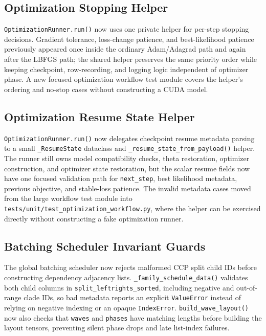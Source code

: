 \documentclass[11pt]{article}
\begin{document}
\subsection{Optimization Stopping Helper}

\texttt{OptimizationRunner.run()} now uses one private helper for per-step
stopping decisions.  Gradient tolerance, loss-change patience, and
best-likelihood patience previously appeared once inside the ordinary
Adam/Adagrad path and again after the LBFGS path; the shared helper preserves
the same priority order while keeping checkpoint, row-recording, and logging
logic independent of optimizer phase.  A new focused optimization workflow test
module covers the helper's ordering and no-stop cases without constructing a
CUDA model.

\subsection{Optimization Resume State Helper}

\texttt{OptimizationRunner.run()} now delegates checkpoint resume metadata
parsing to a small \texttt{\_ResumeState} dataclass and
\texttt{\_resume\_state\_from\_payload()} helper.  The runner still owns model
compatibility checks, theta restoration, optimizer construction, and optimizer
state restoration, but the scalar resume fields now have one focused validation
path for \texttt{next\_step}, best likelihood metadata, previous objective, and
stable-loss patience.  The invalid metadata cases moved from the large workflow
test module into \texttt{tests/unit/test\_optimization\_workflow.py}, where the
helper can be exercised directly without constructing a fake optimization
runner.

\subsection{Batching Scheduler Invariant Guards}

The global batching scheduler now rejects malformed CCP split child IDs before
constructing dependency adjacency lists.  \texttt{\_family\_schedule\_data()}
validates both child columns in \texttt{split\_leftrights\_sorted}, including
negative and out-of-range clade IDs, so bad metadata reports an explicit
\texttt{ValueError} instead of relying on negative indexing or an opaque
\texttt{IndexError}.  \texttt{build\_wave\_layout()} now also checks that
\texttt{waves} and \texttt{phases} have matching lengths before building the
layout tensors, preventing silent phase drops and late list-index failures.
\end{document}
